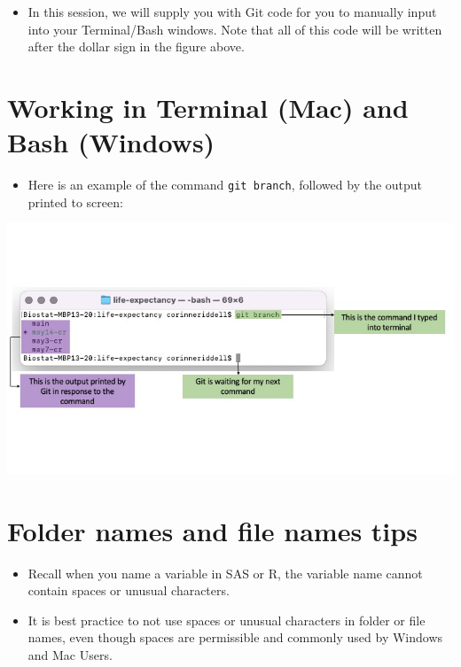 \documentclass[
]{book}
\providecommand{\tightlist}{%
  \setlength{\itemsep}{0pt}\setlength{\parskip}{0pt}}
\begin{document}
\begin{itemize}
\tightlist
\item
  In this session, we will supply you with Git code for you to manually input
  into your Terminal/Bash windows. Note that all of this code will be written after
  the dollar sign in the figure above.
\end{itemize}

\hypertarget{working-in-terminal-mac-and-bash-windows-1}{%
\section{Working in Terminal (Mac) and Bash (Windows)}\label{working-in-terminal-mac-and-bash-windows-1}}

\begin{itemize}
\tightlist
\item
  Here is an example of the command \texttt{git\ branch}, followed by the output printed
  to screen:
\end{itemize}

\includegraphics[width=1\linewidth]{./figures/Terminal-explainer-2}

\hypertarget{folder-names-and-file-names-tips}{%
\section{Folder names and file names tips}\label{folder-names-and-file-names-tips}}

\begin{itemize}
\tightlist
\item
  Recall when you name a variable in SAS or R, the variable name cannot
  contain spaces or unusual characters.
\item
  It is best practice to not use spaces or unusual characters in folder
  or file names, even though spaces are permissible and commonly used by Windows
  and Mac Users.
\end{itemize}
\end{document}
